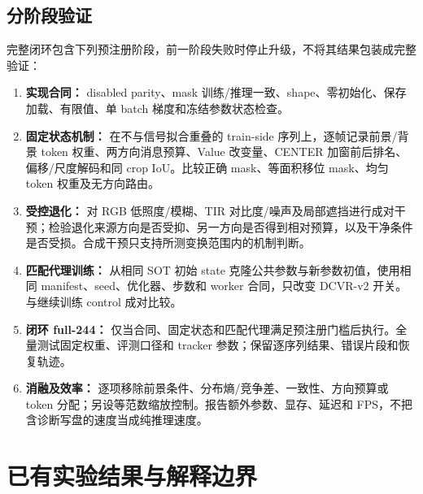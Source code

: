 \documentclass[journal]{IEEEtran}
\begin{document}
\subsection{分阶段验证}
完整闭环包含下列预注册阶段，前一阶段失败时停止升级，不将其结果包装成完整验证：
\begin{enumerate}
  \item \textbf{实现合同：} disabled parity、mask 训练/推理一致、shape、零初始化、保存加载、有限值、单 batch 梯度和冻结参数状态检查。
  \item \textbf{固定状态机制：} 在不与信号拟合重叠的 train-side 序列上，逐帧记录前景/背景 token 权重、两方向消息预算、Value 改变量、CENTER 加窗前后排名、偏移/尺度解码和同 crop IoU。比较正确 mask、等面积移位 mask、均匀 token 权重及无方向路由。
  \item \textbf{受控退化：} 对 RGB 低照度/模糊、TIR 对比度/噪声及局部遮挡进行成对干预；检验退化来源方向是否受抑、另一方向是否得到相对预算，以及干净条件是否受损。合成干预只支持所测变换范围内的机制判断。
  \item \textbf{匹配代理训练：} 从相同 SOT 初始 state 克隆公共参数与新参数初值，使用相同 manifest、seed、优化器、步数和 worker 合同，只改变 DCVR-v2 开关。与继续训练 control 成对比较。
  \item \textbf{闭环 full-244：} 仅当合同、固定状态和匹配代理满足预注册门槛后执行。全量测试固定权重、评测口径和 tracker 参数；保留逐序列结果、错误片段和恢复轨迹。
  \item \textbf{消融及效率：} 逐项移除前景条件、分布熵/竞争差、一致性、方向预算或 token 分配；另设等范数缩放控制。报告额外参数、显存、延迟和 FPS，不把含诊断写盘的速度当成纯推理速度。
\end{enumerate}

\section{已有实验结果与解释边界}
\end{document}
